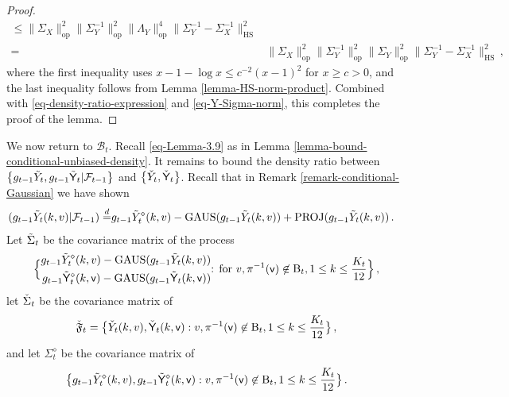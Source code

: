 \documentclass[11pt]{article}
\numberwithin{equation}{section}
\begin{document}
\begin{proof}
\begin{align*}
    \leq \| \Sigma_{X} \|_{\mathrm{op}}^{2} \| \Sigma_{Y}^{-1} \|_{\mathrm{op}}^{2} \| \Lambda_Y \|_{\mathrm{op}}^4 \| \Sigma_{Y}^{-1} - \Sigma_{X}^{-1} \|_{\mathrm{HS}}^2  \\
    = & \| \Sigma_{X} \|_{\mathrm{op}}^{2} \| \Sigma_{Y}^{-1} \|_{\mathrm{op}}^{2} \| \Sigma_{Y} \|_{\mathrm{op}}^2 \| \Sigma_{Y}^{-1} - \Sigma_{X}^{-1} \|_{\mathrm{HS}}^2 \,,
\end{align*}
where the first inequality uses $x-1-\log x \leq c^{-2} (x-1)^2$ for $x \geq c > 0$, and the last inequality follows from Lemma \ref{lemma-HS-norm-product}. Combined with \eqref{eq-density-ratio-expression} and \eqref{eq-Y-Sigma-norm}, this completes the proof of the lemma.
\end{proof}
We now return to $\mathcal{B}_{t}$. Recall \eqref{eq-Lemma-3.9} as in Lemma \ref{lemma-bound-conditional-unbiased-density}.
It remains to bound the density ratio between $\big\{ g_{t-1} \Tilde{Y}_t , g_{t-1} \Tilde{\mathsf{Y}}_t | \mathcal{F}_{t-1} \big\}$ and $\big\{ \Check{Y}_t, \Check{\mathsf{Y}}_t \big\}$. Recall that in Remark \ref{remark-conditional-Gaussian} we have shown
\begin{align*}
    (g_{t-1} \Tilde{Y}_t(k,v) | \mathcal{F}_{t-1}) \overset{d}{=} & g_{t-1}\Tilde{Y}_{t}^{\diamond}(k,v) - \mathrm{GAUS}(g_{t-1}\Tilde{Y}_{t}(k,v)) + \mathrm{PROJ}(g_{t-1}\Tilde{Y}_{t}(k,v))  \,.
\end{align*}
Let $\Tilde{\Sigma}_t $ be the covariance matrix of the process
\begin{align*}
    \Big\{ \begin{split}
    g_{t-1}\Tilde{Y}_{t}^{\diamond}(k,v) - \mathrm{GAUS}(g_{t-1} \Tilde{Y}_{t}(k,v)) \\ g_{t-1} \Tilde{\mathsf{Y}}_{t}^{\diamond}(k,\mathsf{v}) - \mathrm{GAUS}(g_{t-1} \Tilde{\mathsf{Y}}_{t}(k,\mathsf{v})) 
    \end{split}  \mbox{: for }v, \pi^{-1}(\mathsf{v}) \not \in \mathrm{B}_{t}, 1 \leq k \leq \frac{K_t}{12} \Big\} \,,
\end{align*}
let $\Check{\Sigma}_t$ be the covariance matrix of
\begin{equation}\label{eq-def-Check-mathfrak-F-t}
    \Check{\mathfrak F}_t  = \big\{ \Check{Y}_t (k,v) , \Check{\mathsf{Y}}_t (k,\mathsf{v}) : v, \pi^{-1}(\mathsf{v}) \not \in \mathrm{B}_{t}, 1\leq k\leq \frac{K_t}{12} \big\} \,,
\end{equation}
and let $\Sigma^{\diamond}_{t}$ be the covariance matrix of 
\begin{align*}
    \big\{ g_{t-1} \Tilde{Y}^{\diamond}_{t}(k,v), g_{t-1} \Tilde{\mathsf{Y}}^{\diamond}_{t}(k,\mathsf{v}) : v, \pi^{-1}(\mathsf{v}) \not \in \mathrm{B}_{t}, 1 \leq k \leq \frac{K_t}{12} \big\} \,.
\end{align*}
\end{document}
